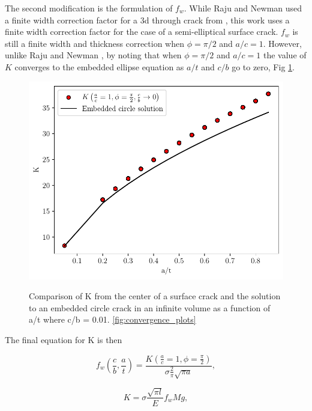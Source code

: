 The second modification is the formulation of $f_w$. While Raju and Newman \cite{RNeqnsbook} used a finite width correction factor for a 3d through crack from \cite{brown1966}, this work uses a finite width correction factor for the case of a semi-elliptical surface crack. $f_w$ is still a finite width and thickness correction when $\phi = \pi/2$ and $a/c = 1$. However, unlike Raju and Newman \cite{RNeqnsbook}, by noting that when  $\phi = \pi/2$ and $a/c = 1$ the value of $K$ converges to the embedded ellipse equation as $a/t$ and $c/b$ go to zero, Fig \ref{fig:fw_convergence}.

\begin{figure}
    \centering
    \includegraphics[width=\textwidth]{Figures_pdf/fw_convergence.pdf}
    \label{fig:fw_convergence}
    \caption{Comparison of K from the center of a surface crack and the solution to an embedded circle crack in an infinite volume as a function of a/t where c/b = 0.01. \ref{fig:convergence_plots}}
\end{figure}

The final equation for K is then

\begin{equation} \label{eqn:fw_parameter_def}
    f_w\left(\frac{c}{b}, \frac{a}{t}\right) = \frac{K\left(\frac{a}{c} = 1, \phi = \frac{\pi}{2}\right)}{\sigma \frac{2}{\pi} \sqrt{\pi a}},
\end{equation}



\begin{equation} \label{eqn:K_semi_with_l}
    K = \sigma \frac{\sqrt{\pi l}}{E} f_w M g,
\end{equation}

